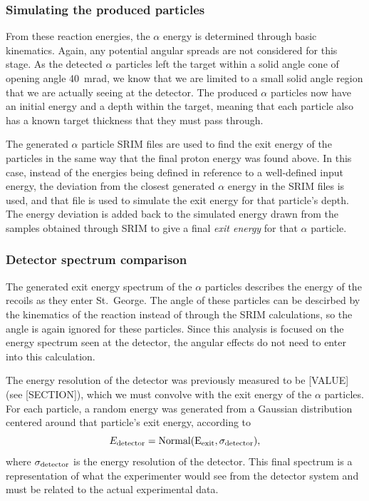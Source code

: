 \subsubsection{Simulating the produced
particles}\label{simulating-the-produced-particles}

From these reaction energies, the $\alpha$ energy is determined through
basic kinematics. Again, any potential angular spreads are not
considered for this stage. As the detected $\alpha$ particles left the
target within a solid angle cone of opening angle 40~mrad, we know that
we are limited to a small solid angle region that we are actually seeing
at the detector. The produced $\alpha$ particles now have an initial
energy and a depth within the target, meaning that each particle also
has a known target thickness that they must pass through.

The generated $\alpha$ particle SRIM files are used to find the exit
energy of the particles in the same way that the final proton energy was
found above. In this case, instead of the energies being defined in
reference to a well-defined input energy, the deviation from the closest
generated $\alpha$ energy in the SRIM files is used, and that file is
used to simulate the exit energy for that particle's depth. The energy
deviation is added back to the simulated energy drawn from the samples
obtained through SRIM to give a final \textit{exit energy} for that
$\alpha$ particle.


\subsubsection{Detector spectrum
comparison}\label{detector-spectrum-comparison}

The generated exit energy spectrum of the $\alpha$ particles describes
the energy of the recoils as they enter St.\ George. The angle of these
particles can be descirbed by the kinematics of the reaction instead of
through the SRIM calculations, so the angle is again ignored for these
particles. Since this analysis is focused on the energy spectrum seen at
the detector, the angular effects do not need to enter into this
calculation.

The energy resolution of the detector was previously measured to be
[VALUE] (see [SECTION]), which we must convolve with the exit energy of
the $\alpha$ particles. For each particle, a random energy was generated
from a Gaussian distribution centered around that particle's exit
energy, according to
\[
    E_{\rm{detector}} = \rm{Normal}(E_{\rm{exit}},\sigma_{\rm{detector}}),
\]
where $\sigma_{\rm{detector}}$ is the energy resolution of the detector.
This final spectrum is a representation of what the experimenter would
see from the detector system and must be related to the actual
experimental data.


